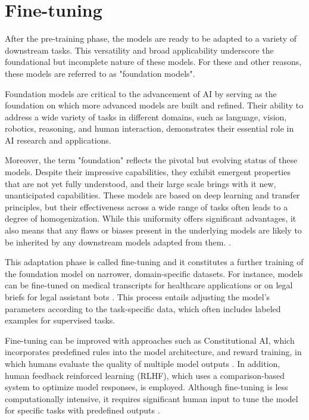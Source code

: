 \section{Fine-tuning}

After the pre-training phase, the models are ready to be adapted to a variety of downstream tasks. This versatility and broad applicability underscore the foundational but incomplete nature of these models. For these and other reasons, these models are referred to as "foundation models".

Foundation models are critical to the advancement of AI by serving as the foundation on which more advanced models are built and refined. Their ability to address a wide variety of tasks in different domains, such as language, vision, robotics, reasoning, and human interaction, demonstrates their essential role in AI research and applications.

Moreover, the term "foundation" reflects the pivotal but evolving status of these models. Despite their impressive capabilities, they exhibit emergent properties that are not yet fully understood, and their large scale brings with it new, unanticipated capabilities. These models are based on deep learning and transfer principles, but their effectiveness across a wide range of tasks often leads to a degree of homogenization. While this uniformity offers significant advantages, it also means that any flaws or biases present in the underlying models are likely to be inherited by any downstream models adapted from them. \cite{bommasani2021opportunities}.

This adaptation phase is called fine-tuning and it constitutes a further training of the foundation model on narrower, domain-specific datasets. For instance, models can be fine-tuned on medical transcripts for healthcare applications or on legal briefs for legal assistant bots \cite{radford2019language}. This process entails adjusting the model's parameters according to the task-specific data, which often includes labeled examples for supervised tasks.

Fine-tuning can be improved with approaches such as Constitutional AI, which incorporates predefined rules into the model architecture, and reward training, in which humans evaluate the quality of multiple model outputs \cite{bai2022constitutional}. In addition, human feedback reinforced learning (RLHF), which uses a comparison-based system to optimize model responses, is employed. Although fine-tuning is less computationally intensive, it requires significant human input to tune the model for specific tasks with predefined outputs \cite{ouyang2022training}.

